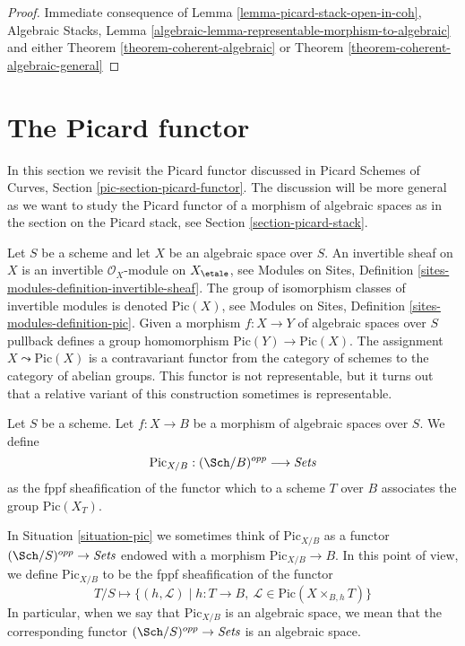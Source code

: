 \begin{proof}
Immediate consequence of
Lemma \ref{lemma-picard-stack-open-in-coh},
Algebraic Stacks, Lemma
\ref{algebraic-lemma-representable-morphism-to-algebraic}
and either
Theorem \ref{theorem-coherent-algebraic}
or
Theorem \ref{theorem-coherent-algebraic-general}
\end{proof}








\section{The Picard functor}
\label{section-picard-functor}

\noindent
In this section we revisit the Picard functor discussed in
Picard Schemes of Curves, Section \ref{pic-section-picard-functor}.
The discussion will be more general as we want to study
the Picard functor of a morphism of algebraic spaces as in
the section on the Picard stack, see Section \ref{section-picard-stack}.

\medskip\noindent
Let $S$ be a scheme and let $X$ be an algebraic space over $S$.
An invertible sheaf on $X$ is an invertible $\mathcal{O}_X$-module
on $X_\etale$, see
Modules on Sites, Definition \ref{sites-modules-definition-invertible-sheaf}.
The group of isomorphism classes of invertible modules is denoted
$\text{Pic}(X)$, see
Modules on Sites, Definition \ref{sites-modules-definition-pic}.
Given a morphism $f : X \to Y$ of algebraic spaces over $S$
pullback defines a group homomorphism $\text{Pic}(Y) \to \text{Pic}(X)$.
The assignment
$X \leadsto \text{Pic}(X)$ is a contravariant functor from the category
of schemes to the category of abelian groups. This functor is not
representable, but it turns out that a relative variant of this
construction sometimes is representable.

\begin{situation}
\label{situation-pic}
Let $S$ be a scheme.
Let $f : X \to B$ be a morphism of algebraic spaces over $S$.
We define
$$
\text{Pic}_{X/B} : (\Sch/B)^{opp} \longrightarrow \textit{Sets}
$$
as the fppf sheafification of the functor which to a scheme $T$
over $B$ associates the group $\text{Pic}(X_T)$.
\end{situation}

\noindent
In Situation \ref{situation-pic} we sometimes think of
$\text{Pic}_{X/B}$ as a functor $(\Sch/S)^{opp} \to \textit{Sets}$
endowed with a morphism $\text{Pic}_{X/B} \to B$. In this point
of view, we define $\text{Pic}_{X/B}$ to be the fppf sheafification of
the functor
$$
T/S \longmapsto \{(h, \mathcal{L}) \mid
h : T \to B,\ \mathcal{L} \in \text{Pic}(X \times_{B, h} T)\}
$$
In particular, when we say that $\text{Pic}_{X/B}$ is an algebraic space,
we mean that the corresponding functor
$(\Sch/S)^{opp} \to \textit{Sets}$ is an algebraic space.

